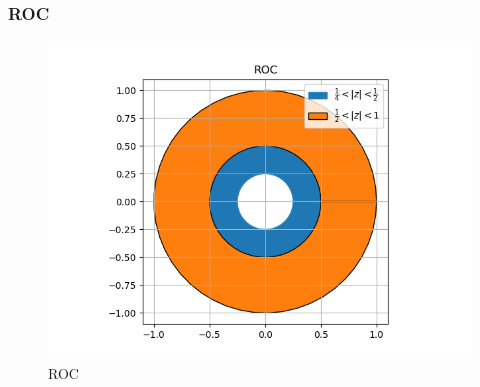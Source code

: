 \documentclass{beamer}
\begin{document}
\begin{frame}
    \frametitle {ROC}
    \begin{flushleft}
    \begin{figure}[!ht]
\centering
 \includegraphics[width=\columnwidth]{graphs/ROC.png}
 \caption{ROC}
 \end{figure}
    \end{flushleft}
\end{frame}
\end{document}
